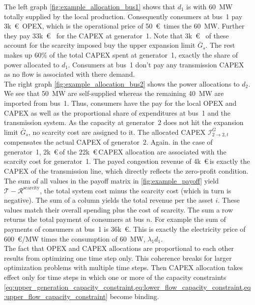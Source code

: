 \documentclass[11pt,twocolumn]{article}
\newcommand{\kk}{k~\euro\,}
\newcommand{\capacitygenerationupper}{\bar{G}_{s}}
\newcommand{\totalcost}{\mathcal{T}}
\newcommand{\capexgeneration}{\mathcal{I}^G}
\newcommand{\remainingcost}{\mathcal{R}}
\newcommand{\scarcitycost}{\remainingcost^\text{scarcity}}
\newcommand{\allocatecapexgeneration}[1][n \rightarrow s]{\capexgeneration_{#1,t}}
\begin{document}
The left graph \cref{fig:example_allocation_bus1} shows that $d_1$ is with 60~MW totally supplied by the local production. Consequently consumers at bus~1 pay 3k~\euro~OPEX, which is the operational price of 50~\euro\, times the 60~MW. Further they pay 33k~\euro~ for the CAPEX at generator~1. Note that 3k~\euro~ of these account for the scarcity imposed buy the upper expansion limit $\capacitygenerationupper$. The rest makes up 60\% of the total CAPEX spent at generator~1, exactly the share of power allocated to $d_1$. Consumers at bus~1 don't pay any transmission CAPEX as no flow is associated with there demand. \\
The right graph \cref{fig:example_allocation_bus2} shows the power allocations to $d_2$. We see that 50~MW are self-supplied whereas the remaining 40~MW are imported from bus~1. Thus, consumers have the pay for the local OPEX and CAPEX as well as the proportional share of expenditures at bus~1 and the transmission system. As the capacity at generator~2 does not hit the expansion limit $\capacitygenerationupper$, no scarcity cost are assigned to it. The allocated CAPEX $\allocatecapexgeneration[2\rightarrow 2]$  compensates  the actual CAPEX of generator~2. Again. in the case of generator~1, 2\kk of the 22\kk CAPEX allocation are associated with the scarcity cost for generator~1. The payed congestion revenue of 4\kk is exactly the CAPEX of the transmission line, which directly reflects the zero-profit condition.   
% 
The sum of all values in the payoff matrix in \cref{fig:example_payoff} yield $\totalcost - \scarcitycost$, the total system cost minus the scarcity cost (which in turn is negative).
The sum of a column  yields the total revenue per the asset $i$. These values match their overall spending plus the cost of scarcity. The sum a row returns the total payment of consumers at bus $n$. For example the sum of payments of consumers at bus~1 is 36k~\euro. This is exactly the electricity price of 600~\euro/MW times the consumption of 60~MW, $\lambda_1 d_1$. \\
% 

The fact that OPEX and CAPEX allocations are proportional to each other results from optimizing one time step only. This coherence breaks for larger optimization problems with multiple time steps. Then CAPEX allocation takes effect only for time steps in which one or more of the capacity constraints  \cref{eq:upper_generation_capacity_constraint,eq:lower_flow_capacity_constraint,eq:upper_flow_capacity_constraint} become binding.  \\
\end{document}
